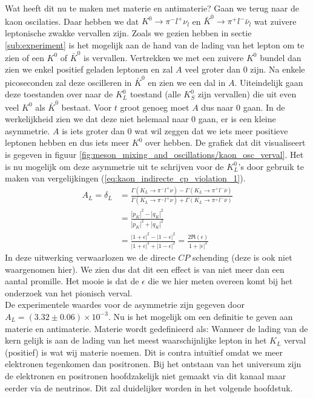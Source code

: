 \documentclass[../main.tex]{subfiles}
\begin{document}
Wat heeft dit nu te maken met materie en antimaterie? Gaan we terug naar de kaon oscilaties. Daar hebben we dat $K^{0} \rightarrow \pi^{-} l^{+} \nu_{l}$ en $\bar{K}^{0} \rightarrow \pi^{+} l^{-} \bar{\nu}_{l}$ wat zuivere leptonische zwakke vervallen zijn. Zoals we gezien hebben in sectie \ref{sub:experiment} is het mogelijk aan de hand van de lading van het lepton om te zien of een $K^0$ of $\bar{K}^0$ is vervallen. Vertrekken we met een zuivere $K^0$ bundel dan zien we enkel positief geladen leptonen en zal $A$ veel groter dan 0 zijn. Na enkele picoseconden zal deze oscilleren in $\bar{K}^0$ en zien we een dal in $A$. Uiteindelijk gaan deze toestanden over naar de $K_L^0$ toestand (alle $K_S^0$ zijn vervallen) die uit even veel $K^0$ als $\bar{K}^0$ bestaat. Voor $t$ groot genoeg moet $A$ dus naar 0 gaan. In de werkelijkheid zien we dat deze niet helemaal naar 0 gaan, er is een kleine asymmetrie. $A$ is iets groter dan 0 wat wil zeggen dat we iets meer positieve leptonen hebben en dus iets meer $K^0$ over hebben. De grafiek dat dit visualiseert is gegeven in figuur \ref{fig:meson_mixing_and_oscillations/kaon_osc_verval}. Het is nu mogelijk om deze asymmetrie uit te schrijven voor de $K_L^0$'s door gebruik te maken van vergelijkingen (\ref{eq:kaon_indirecte_cp_violation_1}).
\begin{equation}
    \begin{aligned}
        \label{eq:asymmetrie_a_l}
        A_{L}=\delta_{L} &=\frac{\Gamma\left(K_{L} \rightarrow \pi^{-} l^{+} \nu\right)-\Gamma\left(K_{L} \rightarrow \pi^{+} l^{-} \bar{\nu}\right)}{\Gamma\left(K_{L} \rightarrow \pi^{-} l^{+} \nu\right)+\Gamma\left(K_{L} \rightarrow \pi^{+} l^{-} \bar{\nu}\right)} \\
                         &=\frac{\left|p_{K}\right|^{2}-\left|q_{K}\right|^{2}}{\left|p_{K}\right|^{2}+\left|q_{K}\right|^{2}} \\
                         &=\frac{|1+\epsilon|^{2}-|1-\epsilon|^{2}}{|1+\epsilon|^{2}+|1-\epsilon|^{2}}=\frac{2 \Re(\epsilon)}{1+|\epsilon|^{2}}
    \end{aligned}
\end{equation}
In deze uitwerking verwaarlozen we de directe $CP$ schending (deze is ook niet waargenomen hier). We zien dus dat dit een effect is van niet meer dan een aantal promille. Het mooie is dat de $\epsilon$ die we hier meten overeen komt bij het onderzoek van het pionisch verval.\\
De experimentele waardes voor de asymmetrie zijn gegeven door $A_{L}=(3.32 \pm 0.06) \times 10^{-3}$. Nu is het mogelijk om een definitie te geven aan materie en antimaterie. Materie wordt gedefinieerd als: Wanneer de lading van de kern gelijk is aan de lading van het meest waarschijnlijke lepton in het $K_L$ verval (positief) is wat wij materie noemen. Dit is contra intuïtief omdat we meer elektronen tegenkomen dan positronen. Bij het ontstaan van het universum zijn de elektronen en positronen hoofdzakelijk niet gemaakt via dit kanaal maar eerder via de neutrinos. Dit zal duidelijker worden in het volgende hoofdstuk.
\end{document}
